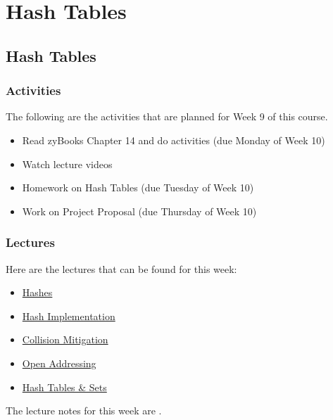 \clearpage

\renewcommand{\ChapTitle}{Hash Tables}

\chapter{\ChapTitle}
\section{\ChapTitle}

\subsection{Activities}

The following are the activities that are planned for Week 9 of this course.

\begin{itemize}
    \item Read zyBooks Chapter 14 and do activities (due Monday of Week 10)
    \item Watch lecture videos
    \item Homework on Hash Tables (due Tuesday of Week 10)
    \item Work on Project Proposal (due Thursday of Week 10)
\end{itemize}

\subsection{Lectures}

Here are the lectures that can be found for this week:

\begin{itemize}
    \item \href{https://applied.cs.colorado.edu/mod/hvp/view.php?id=46014}{Hashes}
    \item \href{https://applied.cs.colorado.edu/mod/hvp/view.php?id=46015}{Hash Implementation}
    \item \href{https://applied.cs.colorado.edu/mod/hvp/view.php?id=46016}{Collision Mitigation}
    \item \href{https://applied.cs.colorado.edu/mod/hvp/view.php?id=46017}{Open Addressing}
    \item \href{https://applied.cs.colorado.edu/mod/hvp/view.php?id=46018}{Hash Tables \& Sets}
\end{itemize}
The lecture notes for this week are .


